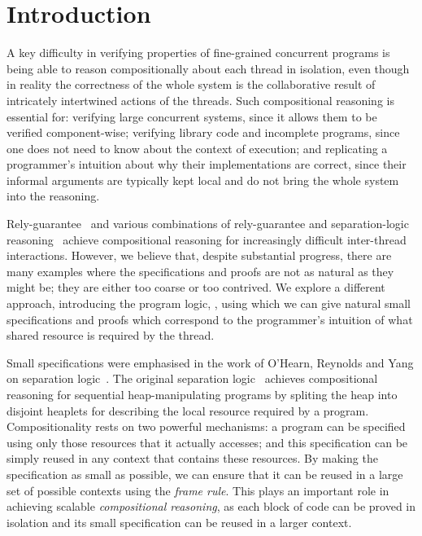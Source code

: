 \section{Introduction}
\label{sec:introduction}



A key difficulty in verifying properties of fine-grained concurrent
programs is being able to reason compositionally about each thread in
isolation, even though in reality the correctness of the whole system
is the collaborative result of intricately intertwined actions of the
threads.  Such compositional reasoning is essential for: verifying
large concurrent systems, since it allows them to be verified
component-wise;  verifying library code and incomplete programs,
since one does not need to know about the context of execution; and 
replicating a programmer's intuition about why their implementations
are correct, since their informal arguments are typically  kept local and do
not bring the whole system into the reasoning.


Rely-guarantee~\cite{rg} and various combinations of
rely-guarantee and separation-logic
reasoning~\cite{viktor-marriage,dg,lrg,cap-ecoop10,icap,tada} achieve
compositional reasoning for increasingly difficult inter-thread
interactions. However, we believe that, despite substantial progress, there are many
examples where the specifications and proofs are not as natural as
they might be; they  are either too coarse or
too 
contrived. 
We explore a different approach, introducing the
program logic, \colosl, using which we can give natural small
specifications and proofs which correspond to the  programmer's intuition of what shared
resource
is required by the thread. 




Small specifications were emphasised in the work of O'Hearn, Reynolds
and Yang on separation logic~\cite{o2001local}.  The original
separation logic~\cite{rey02,seplog} achieves compositional reasoning
for sequential heap-manipulating programs by spliting the heap into
disjoint heaplets for describing the local resource required by a
program. Compositionality rests on two powerful mechanisms: a program
can be specified using only those resources that it actually accesses;
and this specification can be simply reused in any context that
contains these resources.  By making the specification as small as
possible, we can ensure that it can be reused in a large set of
possible contexts using the {\em frame rule}. This plays an important
role in achieving scalable \emph{compositional reasoning}, as each
block of code can be proved in isolation and its small specification
can be reused in a larger context.


